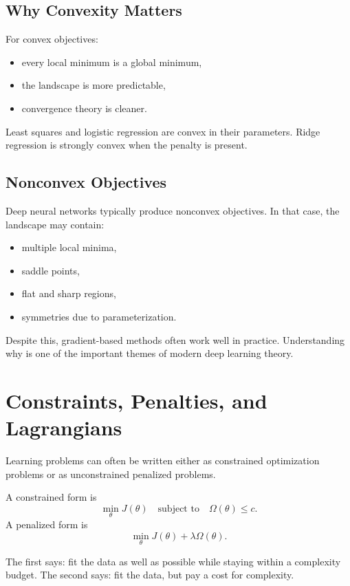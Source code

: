 \subsection{Why Convexity Matters}

For convex objectives:
\begin{itemize}
    \item every local minimum is a global minimum,
    \item the landscape is more predictable,
    \item convergence theory is cleaner.
\end{itemize}

Least squares and logistic regression are convex in their parameters. Ridge regression is strongly convex when the penalty is present.

\subsection{Nonconvex Objectives}

Deep neural networks typically produce nonconvex objectives. In that case, the landscape may contain:
\begin{itemize}
    \item multiple local minima,
    \item saddle points,
    \item flat and sharp regions,
    \item symmetries due to parameterization.
\end{itemize}

Despite this, gradient-based methods often work well in practice. Understanding why is one of the important themes of modern deep learning theory.

\section{Constraints, Penalties, and Lagrangians}

Learning problems can often be written either as constrained optimization problems or as unconstrained penalized problems.

A constrained form is
\[
\min_{\theta} J(\theta)
\quad \text{subject to} \quad \Omega(\theta)\le c.
\]
A penalized form is
\[
\min_{\theta} J(\theta)+\lambda \Omega(\theta).
\]

The first says: fit the data as well as possible while staying within a complexity budget. The second says: fit the data, but pay a cost for complexity.

